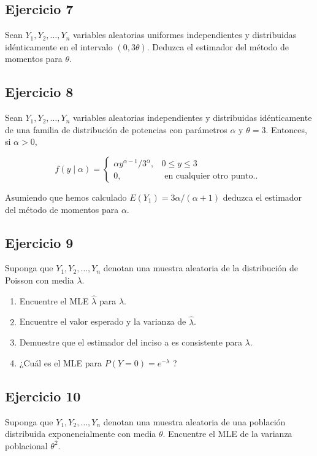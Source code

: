 \documentclass[
]{article}
\providecommand{\tightlist}{%
  \setlength{\itemsep}{0pt}\setlength{\parskip}{0pt}}
\begin{document}
\subsection{Ejercicio 7}\label{ejercicio-7-2}

Sean \(Y_{1}, Y_{2}, \ldots, Y_{n}\) variables aleatorias uniformes independientes y distribuidas idénticamente en el intervalo \((0,3 \theta)\). Deduzca el estimador del método de momentos para \(\theta\).

\subsection{Ejercicio 8}\label{ejercicio-8-2}

Sean \(Y_{1}, Y_{2}, \ldots, Y_{n}\) variables aleatorias independientes y distribuidas idénticamente de una familia de distribución de potencias con parámetros \(\alpha\) y \(\theta=3\). Entonces, si \(\alpha>0\),

\[
f(y \mid \alpha)= \begin{cases}\alpha y^{\alpha-1} / 3^{\alpha}, & 0 \leq y \leq 3 \\ 0, & \text { en cualquier otro punto.. }\end{cases}
\]

Asumiendo que hemos calculado \(E\left(Y_{1}\right)=3 \alpha /(\alpha+1)\) deduzca el estimador del método de momentos para \(\alpha\).

\subsection{Ejercicio 9}\label{ejercicio-9-1}

Suponga que \(Y_{1}, Y_{2}, \ldots, Y_{n}\) denotan una muestra aleatoria de la distribución de Poisson con media \(\lambda\).

\begin{enumerate}
\def\labelenumi{\alph{enumi}.}
\tightlist
\item
  Encuentre el MLE \(\hat{\lambda}\) para \(\lambda\).
\item
  Encuentre el valor esperado y la varianza de \(\hat{\lambda}\).
\item
  Demuestre que el estimador del inciso a es consistente para \(\lambda\).
\item
  ¿Cuál es el MLE para \(P(Y=0)=e^{-\lambda}\) ?
\end{enumerate}

\subsection{Ejercicio 10}\label{ejercicio-10-1}

Suponga que \(Y_{1}, Y_{2}, \ldots, Y_{n}\) denotan una muestra aleatoria de una población distribuida exponencialmente con media \(\theta\). Encuentre el MLE de la varianza poblacional \(\theta^{2}\).
\end{document}
